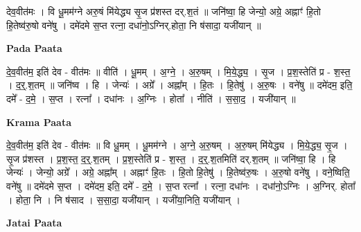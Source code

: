 \documentclass[17pt]{extarticle}
\begin{document}
देव॒वीत॑मः । वि धू॒मम॑ग्ने अरु॒षं मि॑येद्ध्य सृ॒ज प्र॑शस्त दर्.श॒तं ॥ जनि॑ष्वा॒ हि जेन्यो॒ अग्रे॒ अह्नाꣳ॑ हि॒तो हि॒तेष्व॑रु॒षो वने॑षु । दमे॑दमे स॒प्त रत्ना॒ दधा॑नो॒ऽग्निर्.होता॒ नि ष॑सादा॒ यजी॑यान् ॥ \newline

\textbf{Pada Paata} \newline

दे॒व॒वीत॑म॒ इति॑ देव - वीत॑मः ॥ वीति॑ । धू॒मम् । अ॒ग्ने॒ । अ॒रु॒षम् । मि॒ये॒द्ध्य॒ । सृ॒ज । प्र॒श॒स्तेति॑ प्र - श॒स्त॒ । द॒र्॒.श॒तम् ॥ जनि॑ष्व । हि । जेन्यः॑ । अग्रे᳚ । अह्ना᳚म् । हि॒तः । हि॒तेषु॑ । अ॒रु॒षः । वने॑षु ॥ दमे॑दम॒ इति॒ दमे᳚ - द॒मे॒ । स॒प्त । रत्ना᳚ । दधा॑नः । अ॒ग्निः । होता᳚ । नीति॑ । स॒सा॒द॒ । यजी॑यान् ॥  \newline


\textbf{Krama Paata} \newline

दे॒व॒वीत॑म॒ इति॑ देव - वीत॑मः ॥ वि धू॒मम् । धू॒मम॑ग्ने । अ॒ग्ने॒ अ॒रु॒षम् । अ॒रु॒षम् मि॑येद्ध्य । मि॒ये॒द्ध्य॒ सृ॒ज । सृ॒ज प्र॑शस्त । प्र॒श॒स्त॒ द॒र्॒.श॒तम् । प्र॒श॒स्तेति॑ प्र - श॒स्त॒ । द॒र्॒.श॒तमिति॑ दर्.श॒तम् ॥ जनि॑ष्वा॒ हि । 
हि जेन्यः॑ । जेन्यो॒ अग्रे᳚ । अग्रे॒ अह्ना᳚म् । अह्नाꣳ॑ हि॒तः । हि॒तो हि॒तेषु॑ । हि॒तेष्व॑रु॒षः । अ॒रु॒षो वने॑षु । वने॒ष्विति॒ वने॑षु ॥ दमे॑दमे स॒प्त । दमे॑दम॒ इति॒ दमे᳚ - द॒मे॒ । स॒प्त रत्ना᳚ । रत्ना॒ दधा॑नः । दधा॑नो॒ऽग्निः । अ॒ग्निर्. होता᳚ । होता॒ नि । नि ष॑साद । स॒सा॒दा॒ यजी॑यान् । यजी॑या॒निति॒ यजी॑यान् । \newline

\textbf{Jatai Paata} \newline
\end{document}
